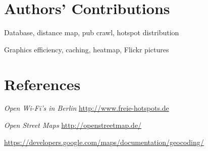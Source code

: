 \section*{Authors' Contributions}

\begin{description}
\setlength{\itemsep}{0pt}
  \item[Andreas Ergenzinger] Database, distance map, pub crawl, hotspot distribution
  \item[Josua Krause] Graphics efficiency, caching, heatmap, Flickr pictures
\end{description}

\section*{References}

\begin{description}
\setlength{\itemsep}{0pt}
\item[Wi-Fi Positions.]\emph{Open Wi-Fi's in Berlin}
  \url{http://www.freie-hotspots.de}
\item[OSM.]\emph{Open Street Maps}
  \url{http://openstreetmap.de/}
\item[Google Geocoding API.]
  \url{https://developers.google.com/maps/documentation/geocoding/}
\end{description}
